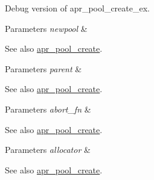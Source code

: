 Debug version of apr\+\_\+pool\+\_\+create\+\_\+ex. 
\begin{DoxyParams}{Parameters}
{\em newpool} & \\
\hline
\end{DoxyParams}
\begin{DoxySeeAlso}{See also}
\mbox{\hyperlink{group__apr__pools_gaa7c40921aae156b665e82b0a66991a39}{apr\+\_\+pool\+\_\+create}}. 
\end{DoxySeeAlso}

\begin{DoxyParams}{Parameters}
{\em parent} & \\
\hline
\end{DoxyParams}
\begin{DoxySeeAlso}{See also}
\mbox{\hyperlink{group__apr__pools_gaa7c40921aae156b665e82b0a66991a39}{apr\+\_\+pool\+\_\+create}}. 
\end{DoxySeeAlso}

\begin{DoxyParams}{Parameters}
{\em abort\+\_\+fn} & \\
\hline
\end{DoxyParams}
\begin{DoxySeeAlso}{See also}
\mbox{\hyperlink{group__apr__pools_gaa7c40921aae156b665e82b0a66991a39}{apr\+\_\+pool\+\_\+create}}. 
\end{DoxySeeAlso}

\begin{DoxyParams}{Parameters}
{\em allocator} & \\
\hline
\end{DoxyParams}
\begin{DoxySeeAlso}{See also}
\mbox{\hyperlink{group__apr__pools_gaa7c40921aae156b665e82b0a66991a39}{apr\+\_\+pool\+\_\+create}}. 
\end{DoxySeeAlso}

